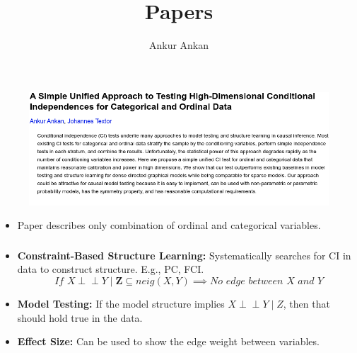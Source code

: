 \documentclass{beamer}
\def\ci{\perp\!\!\!\!\!\perp}
\begin{document}
\title[]{Papers}
\author [] {Ankur Ankan}
\date{}
\maketitle

\begin{frame}
	\frametitle{}
	\begin{figure}
		\centering
		\includegraphics[scale=0.4]{imgs/ankan_textor}
		\caption*{}
	\end{figure}
	\vspace{-2em}
	\begin{itemize}
		\item Paper describes only combination of ordinal and categorical variables.	
	\end{itemize}
\end{frame}

\begin{frame}
	\frametitle{}
	\begin{itemize}
		\item \textbf{Constraint-Based Structure Learning:} Systematically searches for CI in data to construct structure. E.g., PC, FCI.
			$$ \textit{ If } X \ci Y \mid \bm{Z} \subseteq \textit{neig}(X, Y)  \implies \textit{No edge between X and Y} $$
		\item \textbf{Model Testing:} If the model structure implies $ X \ci Y \mid Z $, then that should hold true in the data.
		\item \textbf{Effect Size:} Can be used to show the edge weight between variables.
	\end{itemize}
\end{frame}
\end{document}
